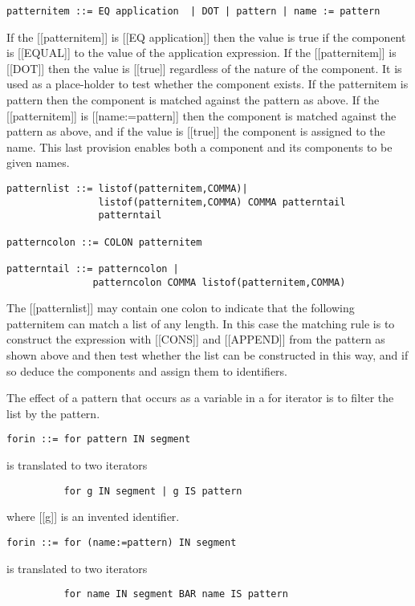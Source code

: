\documentclass{article}
\begin{document}
\begin{verbatim}
patternitem ::= EQ application  | DOT | pattern | name := pattern
\end{verbatim}

If the [[patternitem]] is [[EQ application]] then the value is true if
the component is [[EQUAL]] to the value of the application expression.
If the [[patternitem]] is [[DOT]] then the value is [[true]] regardless of the
nature of the component.  It is used as a place-holder to test
whether the component exists.
If the patternitem is pattern then the component is matched against
the pattern as above.
If the [[patternitem]] is [[name:=pattern]] then the component is
matched against
the pattern as above, and if the value is [[true]] the component is assigned
to the name.  This last provision enables both a component and
its components to be given names.
\begin{verbatim}
patternlist ::= listof(patternitem,COMMA)|
                listof(patternitem,COMMA) COMMA patterntail
                patterntail

patterncolon ::= COLON patternitem

patterntail ::= patterncolon |
               patterncolon COMMA listof(patternitem,COMMA)
\end{verbatim}

The [[patternlist]] may contain one colon to indicate that the following
patternitem can match a list of any length. In this case
the matching rule is to construct the expression
with [[CONS]] and [[APPEND]] from the pattern as shown above and then test
whether the list can be constructed in this way, and if so
deduce the components and assign them to identifiers.

The effect of a pattern that occurs as a variable in a for iterator
is to filter the list by the pattern.
\begin{verbatim}
forin ::= for pattern IN segment
\end{verbatim}

is translated to two iterators
\begin{verbatim}
          for g IN segment | g IS pattern
\end{verbatim}
where [[g]] is an invented identifier.
\begin{verbatim}
forin ::= for (name:=pattern) IN segment
\end{verbatim}

is translated to two iterators
\begin{verbatim}
          for name IN segment BAR name IS pattern
\end{verbatim}
\end{document}

